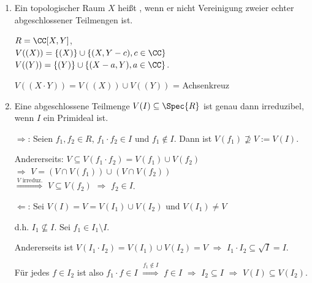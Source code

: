 \begin{DefProp}

\begin{enumerate}
\item Ein topologischer Raum $X$ heißt , wenn er nicht Vereinigung zweier echter abgeschlossener Teilmengen ist.

\begin{nnBsp}
$R = \CC[X,Y]$,\\
$V((X)) = \{ (X) \} \cup \{ (X, Y - c), c \in \CC \}$\\
$V((Y)) = \{ (Y) \} \cup \{ (X -a, Y), a \in \CC \}$.

$V((X \cdot Y)) = V( (X) ) \cup V( (Y) )$ = Achsenkreuz
\end{nnBsp}

\item Eine abgeschlossene Teilmenge $V(I) \subseteq \Spec{R}$ ist genau dann irreduzibel, wenn $I$ ein Primideal ist.

\begin{Bew}
\glqq$\Rightarrow$\grqq: Seien $f_1, f_2 \in R$, $f_1 \cdot f_2 \in I$ und $f_1 \notin I$. Dann ist $V(f_1) \nsupseteq V := V(I)$.

Andererseits: $V \subseteq V(f_1 \cdot f_2) = V(f_1) \cup V(f_2)$\\
$\Rightarrow$ $V = (V \cap V(f_1)) \cup (V \cap V(f_2))$\\
$\overset{V \text{ irreduz.}}\Rightarrow$ $V \subseteq V(f_2)$ $\Rightarrow$ $f_2 \in I$.

\glqq$\Leftarrow$\grqq: Sei $V(I) = V = V(I_1) \cup V(I_2)$ und $V(I_1) \neq V$

d.h. $I_1 \nsubseteq I$. Sei $f_1 \in I_1 \setminus I$.

Andererseits ist $V(I_1 \cdot I_2) = V(I_1) \cup V(I_2) = V$ $\Rightarrow$ $I_1 \cdot I_2 \subseteq \sqrt{I} = I$.

F\"ur jedes $f \in I_2$ ist also $f_1 \cdot f \in I$ $\overset{f_1 \notin I}\Rightarrow$ $f \in I$ $\Rightarrow$ $I_2 \subseteq I$ $\Rightarrow$ $V(I) \subseteq V(I_2)$.

\end{Bew}

\end{enumerate}

\end{DefProp}

